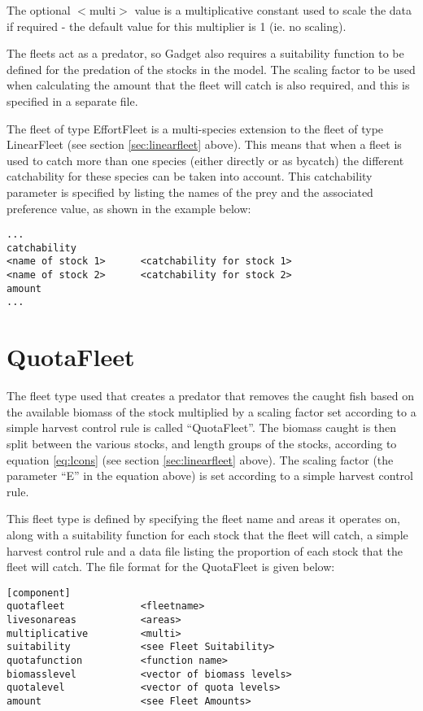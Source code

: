 \documentclass[]{book}
\begin{document}
The optional \(<\)multi\(>\) value is a multiplicative constant used to
scale the data if required - the default value for this multiplier is 1
(ie. no scaling).

The fleets act as a predator, so Gadget also requires a suitability
function to be defined for the predation of the stocks in the model. The
scaling factor to be used when calculating the amount that the fleet
will catch is also required, and this is specified in a separate file.

The fleet of type EffortFleet is a multi-species extension to the fleet
of type LinearFleet (see
section \ref{sec:linearfleet} above). This means that when a fleet is
used to catch more than one species (either directly or as bycatch) the
different catchability for these species can be taken into account. This
catchability parameter is specified by listing the names of the prey and
the associated preference value, as shown in the example below:

\begin{verbatim}
...
catchability
<name of stock 1>      <catchability for stock 1>
<name of stock 2>      <catchability for stock 2>
amount
...
\end{verbatim}

\hypertarget{sec:quotafleet}{%
\section{QuotaFleet}\label{sec:quotafleet}}

The fleet type used that creates a predator that removes the caught fish
based on the available biomass of the stock multiplied by a scaling
factor set according to a simple harvest control rule is called
``QuotaFleet''. The biomass caught is then split between the various
stocks, and length groups of the stocks, according to
equation \eqref{eq:lcons} (see
section \ref{sec:linearfleet} above). The scaling factor (the parameter
``E'' in the equation above) is set according to a simple harvest control
rule.

This fleet type is defined by specifying the fleet name and areas it
operates on, along with a suitability function for each stock that the
fleet will catch, a simple harvest control rule and a data file listing
the proportion of each stock that the fleet will catch. The file format
for the QuotaFleet is given below:

\begin{verbatim}
[component]
quotafleet             <fleetname>
livesonareas           <areas>
multiplicative         <multi>
suitability            <see Fleet Suitability>
quotafunction          <function name>
biomasslevel           <vector of biomass levels>
quotalevel             <vector of quota levels>
amount                 <see Fleet Amounts>
\end{verbatim}
\end{document}
